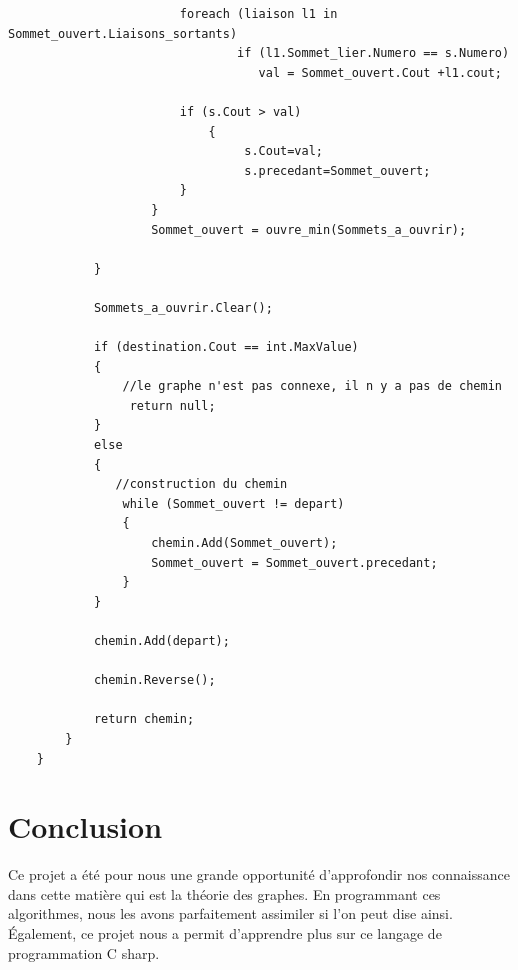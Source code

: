 \documentclass[11pt,twoside,a4paper]{article}
\begin{document}
\begin{verbatim}
                        foreach (liaison l1 in Sommet_ouvert.Liaisons_sortants)
                                if (l1.Sommet_lier.Numero == s.Numero)
                                   val = Sommet_ouvert.Cout +l1.cout;
                       
                        if (s.Cout > val)
                            {
                                 s.Cout=val;
                                 s.precedant=Sommet_ouvert;
                        }
                    }
                    Sommet_ouvert = ouvre_min(Sommets_a_ouvrir);

            }

            Sommets_a_ouvrir.Clear();

            if (destination.Cout == int.MaxValue)
            {
                //le graphe n'est pas connexe, il n y a pas de chemin
                 return null;
            }
            else          
            {
               //construction du chemin 
                while (Sommet_ouvert != depart)
                {
                    chemin.Add(Sommet_ouvert);
                    Sommet_ouvert = Sommet_ouvert.precedant;
                }
            }

            chemin.Add(depart);

            chemin.Reverse();

            return chemin;
        }
    }
\end{verbatim}

\newpage
\section{Conclusion}
Ce projet a été pour nous une grande opportunité d'approfondir nos connaissance dans cette matière qui est la théorie des graphes. En programmant ces algorithmes, nous les avons parfaitement assimiler si l'on peut dise ainsi. Également, ce projet nous a permit  d'apprendre plus sur ce langage de programmation C sharp.
\end{document}
